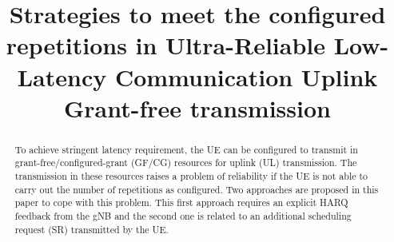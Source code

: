 \documentclass[conference]{IEEEtran}
\begin{document}
\title{Strategies to meet the configured repetitions in Ultra-Reliable Low-Latency Communication Uplink Grant-free transmission\\
}

\author{
\and
{}
}

\maketitle

\begin{abstract}
To achieve stringent latency requirement, the UE can be configured to transmit in grant-free/configured-grant (GF/CG) resources for  uplink (UL) transmission. The transmission in these resources raises a problem of reliability if the UE is not able to carry out the number of repetitions as configured. Two approaches are proposed in this paper to cope with this problem. This first approach requires an explicit HARQ feedback from the gNB and the second one is related to an additional scheduling request (SR) transmitted by the UE.
\end{abstract}
\end{document}
